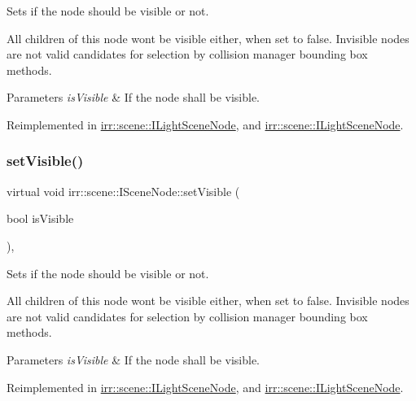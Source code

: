 Sets if the node should be visible or not. 

All children of this node won\textquotesingle{}t be visible either, when set to false. Invisible nodes are not valid candidates for selection by collision manager bounding box methods. 
\begin{DoxyParams}{Parameters}
{\em is\+Visible} & If the node shall be visible. \\
\hline
\end{DoxyParams}


Reimplemented in \hyperlink{classirr_1_1scene_1_1ILightSceneNode_a3a6a6681a665ec4c214cda8a84a29337}{irr\+::scene\+::\+I\+Light\+Scene\+Node}, and \hyperlink{classirr_1_1scene_1_1ILightSceneNode_a3a6a6681a665ec4c214cda8a84a29337}{irr\+::scene\+::\+I\+Light\+Scene\+Node}.

\mbox{\label{classirr_1_1scene_1_1ISceneNode_a2e3a88fe87d11caa7986a203afe6838c}} 
\subsubsection{\texorpdfstring{set\+Visible()}{setVisible()}\hspace{0.1cm}{\footnotesize\ttfamily [2/2]}}
{\footnotesize\ttfamily virtual void irr\+::scene\+::\+I\+Scene\+Node\+::set\+Visible (\begin{DoxyParamCaption}\item[{bool}]{is\+Visible }\end{DoxyParamCaption})\hspace{0.3cm}{\ttfamily [inline]}, {\ttfamily [virtual]}}



Sets if the node should be visible or not. 

All children of this node won\textquotesingle{}t be visible either, when set to false. Invisible nodes are not valid candidates for selection by collision manager bounding box methods. 
\begin{DoxyParams}{Parameters}
{\em is\+Visible} & If the node shall be visible. \\
\hline
\end{DoxyParams}


Reimplemented in \hyperlink{classirr_1_1scene_1_1ILightSceneNode_a3a6a6681a665ec4c214cda8a84a29337}{irr\+::scene\+::\+I\+Light\+Scene\+Node}, and \hyperlink{classirr_1_1scene_1_1ILightSceneNode_a3a6a6681a665ec4c214cda8a84a29337}{irr\+::scene\+::\+I\+Light\+Scene\+Node}.

